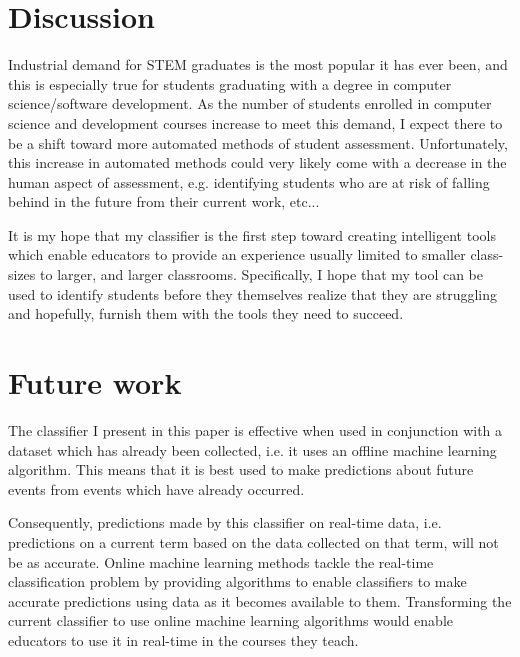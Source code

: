 \documentclass[sigchi]{acmart}
\begin{document}
\section{Discussion}

Industrial demand for STEM graduates is the most popular it has ever been, and this is especially true for students graduating with a degree in computer science/software development. As the number of students enrolled in computer science and development courses increase to meet this demand, I expect there to be a shift toward more automated methods of student assessment. Unfortunately, this increase in automated methods could very likely come with a decrease in the human aspect of assessment, e.g. identifying students who are at risk of falling behind in the future from their current work, etc...
\par It is my hope that my classifier is the first step toward creating intelligent tools which enable educators to provide an experience usually limited to smaller class-sizes to larger, and larger classrooms. Specifically, I hope that my tool can be used to identify students before they themselves realize that they are struggling and hopefully, furnish them with the tools they need to succeed.

\section{Future work}
The classifier I present in this paper is effective when used in conjunction with a dataset which has already been collected, i.e. it uses an offline machine learning algorithm. This means that it is best used to make predictions about future events from events which have already occurred.
\par Consequently, predictions made by this classifier on real-time data, i.e. predictions on a current term based on the data collected on that term, will not be as accurate. Online machine learning \cite{1315937} methods tackle the real-time classification problem by providing algorithms to enable classifiers to make accurate predictions using data as it becomes available to them. Transforming the current classifier to use online machine learning algorithms would enable educators to use it in real-time in the courses they teach. 
\end{document}
